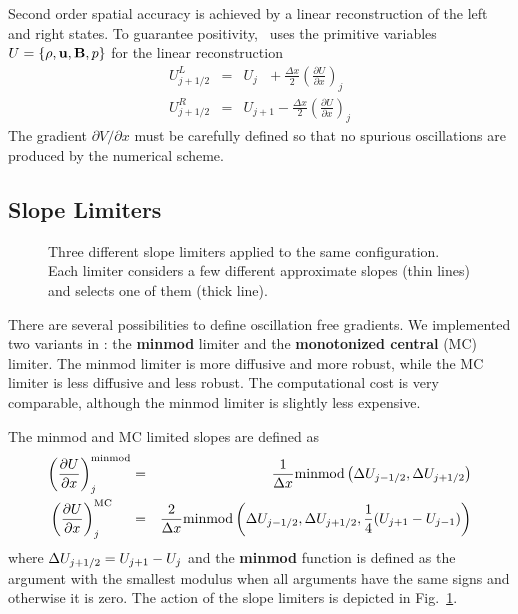 Second order spatial accuracy is achieved by a linear reconstruction
of the left and right states. To guarantee positivity, 
\BATSRUS\ uses the primitive variables $U=\{\rho,\mathbf{u},\mathbf{B},p\}$ 
for the linear reconstruction
\begin{eqnarray}
  U_{j+1/2}^L&=&U_{j}\ \ \ 
  + \frac{\Delta x}{2}\left(\frac{\partial U}{\partial x}\right)_j 
\nonumber\\
   U_{j+1/2}^R&=&U_{j+1} 
  - \frac{\Delta x}{2}\left(\frac{\partial U}{\partial x}\right)_j 
\label{q-LR-second-order}
\end{eqnarray}
The gradient $\partial V/\partial x$ must be carefully defined so that
no spurious oscillations are produced by the numerical scheme. 

\subsection{Slope Limiters \label{section:limiters}}

\begin{figure}
   \centerline{}
   \caption{Three different slope limiters applied to the same
            configuration. Each limiter considers a few different 
            approximate slopes (thin lines) and selects one of them
            (thick line).
           }
\label{fig:limiter}
\end{figure}

There are several possibilities to define oscillation free gradients. 
We implemented two variants in \BATSRUS: the {\bf minmod} limiter
and the {\bf monotonized central} (MC) limiter. The minmod limiter
is more diffusive and more robust, while the MC limiter is less diffusive
and less robust. The computational cost is very comparable, although the
minmod limiter is slightly less expensive.

The minmod and MC limited slopes are defined as
\begin{eqnarray}
   \left(\frac{\partial U}{\partial x}\right)^{\rm minmod}_j &=& 
   \frac{1}{\Delta x}\mathrm{minmod}\left(\Delta U_{j-1/2},\Delta U_{j+1/2}\right) 
\label{q-limiter} \\
   \left(\frac{\partial U}{\partial x}\right)^{\rm MC}_j~~~~ &=&
  \frac{2}{\Delta x}\mathrm{minmod}\left(\Delta U_{j-1/2},\Delta U_{j+1/2}, 
           \frac14(U_{j+1}-U_{j-1})\right)
\nonumber
\end{eqnarray}
where $\Delta U_{j+1/2}=U_{j+1}-U_j$ and the {\bf minmod} 
function is defined as the argument with the smallest modulus 
when all arguments have the same signs and otherwise it is zero.
The action of the slope limiters is depicted in Fig.~\ref{fig:limiter}.


%



